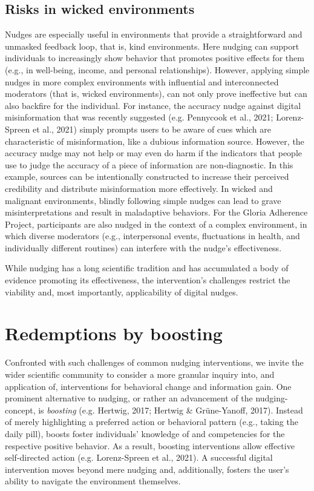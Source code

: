 \documentclass[reflection, authordate]{jote-new-article}
\begin{document}
\subsection{Risks in wicked environments}



Nudges are especially useful in environments that provide a straightforward and unmasked feedback loop, that is, kind environments. Here nudging can support individuals to increasingly show behavior that promotes positive effects for them (e.g., in well-being, income, and personal relationships). However, applying simple nudges in more complex environments with influential and interconnected moderators (that is, wicked environments), can not only prove ineffective but can also backfire for the individual. For instance, the accuracy nudge against digital misinformation that was recently suggested (e.g. Pennycook et al., 2021; Lorenz-Spreen et al., 2021) simply prompts users to be aware of cues which are characteristic of misinformation, like a dubious information source. However, the accuracy nudge may not help or may even do harm if the indicators that people use to judge the accuracy of a piece of information are non-diagnostic. In this example, sources can be intentionally constructed to increase their perceived credibility and distribute misinformation more effectively. In wicked and malignant environments, blindly following simple nudges can lead to grave misinterpretations and result in maladaptive behaviors. For the Gloria Adherence Project, participants are also nudged in the context of a complex environment, in which diverse moderators (e.g., interpersonal events, fluctuations in health, and individually different routines) can interfere with the nudge’s effectiveness.



While nudging has a long scientific tradition and has accumulated a body of evidence promoting its effectiveness, the intervention’s challenges restrict the viability and, most importantly, applicability of digital nudges.



\section{Redemptions by boosting}



Confronted with such challenges of common nudging interventions, we invite the wider scientific community to consider a more granular inquiry into, and application of, interventions for behavioral change and information gain. One prominent alternative to nudging, or rather an advancement of the nudging-concept, is \emph{boosting} (e.g. Hertwig, 2017; Hertwig \& Grüne-Yanoff, 2017). Instead of merely highlighting a preferred action or behavioral pattern (e.g., taking the daily pill), boosts foster individuals’ knowledge of and competencies for the respective positive behavior. As a result, boosting interventions allow effective self-directed action (e.g. Lorenz-Spreen et al., 2021). A successful digital intervention moves beyond mere nudging and, additionally, fosters the user’s ability to navigate the environment themselves.
\end{document}
